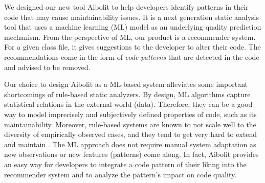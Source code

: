 We designed our new tool Aibolit to help developers identify patterns in their
code  that may cause maintainability issues. It is a next generation static
analysis tool that uses a machine learning (ML) model as an underlying quality
prediction mechanism. From the perspective of ML, our product is a recommender
system. For a given class file, it gives suggestions to the developer to alter
their code. The recommendations come in the form of \textit{code patterns} that
are detected in the code and advised to be removed.

Our choice to design Aibolit as a ML-based system alleviates some important
shortcomings of rule-based static analyzers. By design, ML algorithms capture
statistical relations in the external world (data). Therefore, they can be a
good way to model imprecisely and subjectively defined properties of code, such
as its maintainability. Moreover, rule-based systems are known to not scale well
to the diversity of empirically observed cases, and they tend to get very hard
to extend and maintain \citep{LenatFeigenbaum1987}. The ML
approach does not require
manual system adaptation as new observations or new features (patterns) come
along. In fact, Aibolit provides an easy way for developers to integrate a code
pattern of their liking into the recommender system and to analyze the pattern's
impact on code quality.






